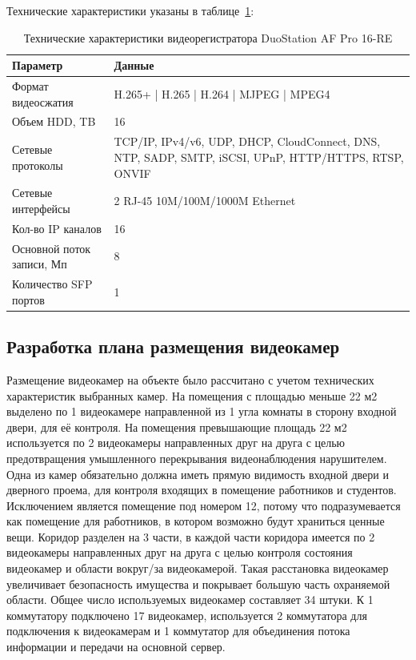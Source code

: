 Технические характеристики указаны в таблице~\ref{tab::recorder-parameters}:
\begin{longtable}{|p{5cm}|p{12cm}|}
    \caption{Технические характеристики видеорегистратора DuoStation AF Pro 16-RE}
    \label{tab::recorder-parameters} \\

    \hline
    Параметр &
    Данные \\
    \hline
    Формат видеосжатия &
    H.265+ | H.265 | H.264 | MJPEG | MPEG4 \\
    \hline
    Объем HDD, TB &
    16 \\
    \hline
    Сетевые протоколы &
    TCP/IP, IPv4/v6, UDP, DHCP, CloudConnect, DNS, NTP, SADP, SMTP, iSCSI, UPnP, HTTP/HTTPS, RTSP, ONVIF \\
    \hline
    Сетевые интерфейсы &
    2 RJ-45 10M/100M/1000M Ethernet \\
    \hline
    Кол-во IP каналов &
    16 \\
    \hline
    Основной поток записи, Мп &
    8 \\
    \hline
    Количество SFP портов &
    1 \\
    \hline
\end{longtable}

\subsection{Разработка плана размещения видеокамер}

Размещение видеокамер на объекте было рассчитано с учетом технических характеристик выбранных камер. 
На помещения с площадью меньше 22 м2 выделено по 1 видеокамере направленной из 1 угла комнаты в сторону входной двери, для её контроля. 
На помещения превышающие площадь 22 м2 используется по 2 видеокамеры направленных друг на друга с целью предотвращения умышленного 
перекрывания видеонаблюдения нарушителем. Одна из камер обязательно должна иметь прямую видимость входной двери и дверного проема, 
для контроля входящих в помещение работников и студентов. Исключением является помещение под номером 12, потому что подразумевается как 
помещение для работников, в котором возможно будут храниться ценные вещи. Коридор разделен на 3 части, в каждой части коридора имеется 
по 2 видеокамеры направленных друг на друга с целью контроля состояния видеокамер и области вокруг/за видеокамерой. Такая расстановка 
видеокамер увеличивает безопасность имущества и покрывает большую часть охраняемой области. Общее число используемых видеокамер составляет 
34 штуки. К 1 коммутатору подключено 17 видеокамер, используется 2 коммутатора для подключения к видеокамерам и 1 коммутатор для объединения 
потока информации и передачи на основной сервер.

